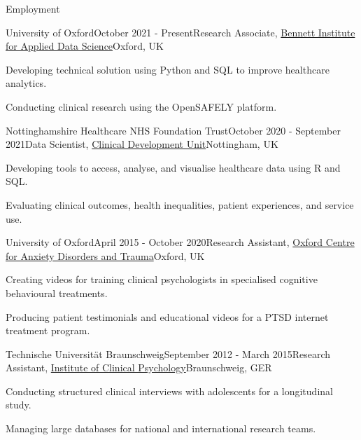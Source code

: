 \documentclass{resume} %
\begin{document}

\begin{rSection}{Employment}

\begin{rSubsection}{University of Oxford}{October 2021 - Present}{Research Associate, \href{https://www.bennett.ox.ac.uk/}{Bennett Institute for Applied Data Science}}{Oxford, UK}
  \item Developing technical solution using Python and SQL to improve healthcare analytics.
  \item Conducting clinical research using the OpenSAFELY platform.
\end{rSubsection}

\begin{rSubsection}{Nottinghamshire Healthcare NHS Foundation Trust}{October 2020 - September 2021}{Data Scientist, \href{https://www.nottinghamshirehealthcare.nhs.uk/}{Clinical Development Unit}}{Nottingham, UK}
  \item Developing tools to access, analyse, and visualise healthcare data using R and SQL.
  \item Evaluating clinical outcomes, health inequalities, patient experiences, and service use.
\end{rSubsection}

\begin{rSubsection}{University of Oxford}{April 2015 - October 2020}{Research Assistant, \href{https://www.psy.ox.ac.uk/research/oxford-centre-for-anxiety-disorders-and-trauma}{Oxford Centre for Anxiety Disorders and Trauma}}{Oxford, UK}
  \item Creating videos for training clinical psychologists in specialised cognitive behavioural treatments.
  \item Producing patient testimonials and educational videos for a PTSD internet treatment program.
\end{rSubsection}

\begin{rSubsection}{Technische Universit{\"a}t Braunschweig}{September 2012 - March 2015}{Research Assistant, \href{https://www.tu-braunschweig.de/psychologie/klinische}{Institute of Clinical Psychology}}{Braunschweig, GER}
  \item Conducting structured clinical interviews with adolescents for a longitudinal study.
  \item Managing large databases for national and international research teams.
\end{rSubsection}

\end{rSection}
\end{document}

